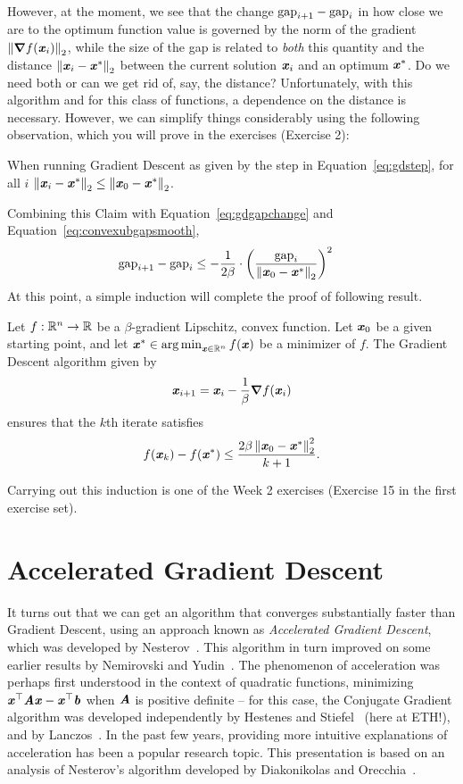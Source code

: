However, at the moment, we see that the change $\gap_{i+1}- \gap_i$
in how close we are to the optimum function value is governed by the norm of the gradient $\norm{\grad
  f(\xx_{i})}_2$, while the size of the gap is related to \emph{both}
this quantity and the distance $\norm{\xx_i - \xx^*}_2$ between the
current solution $\xx_i$ and an optimum $\xx^*$.
Do we need both or can we get rid of, say, the distance?
Unfortunately, with this algorithm and for this class of functions, a
dependence on the distance is necessary.
However, we can simplify things considerably using the following
observation, which you will prove in the exercises (Exercise 2):
\begin{claim}
  \label{clm:gdoptdist}
  When running Gradient Descent as given by the step in
  Equation~\eqref{eq:gdstep},  for all $i$
  $\norm{\xx_i - \xx^*}_2 \leq \norm{\xx_0 - \xx^*}_2$.
\end{claim}
Combining this Claim with Equation~\eqref{eq:gdgapchange} and Equation~\eqref{eq:convexubgapsmooth},
\begin{align}
\label{eq:convexgapsmooth}
  \gap_{i+1}- \gap_i
  &\leq
    -
    \frac{1}{2\beta}
    \cdot
    \left(
    \frac{\gap_i}{\norm{\xx_0 - \xx^*}_2 }
    \right)^2
\end{align}
At this point, a simple induction will complete the proof of following result.
\begin{theorem}
  \label{thm:gdsmoothconv}
  Let $f : \R^n \to \R$ be a $\beta$-gradient Lipschitz, convex
  function.
  Let $\xx_0$ be a given starting point,
  and let $\xx^* \in \argmin_{\xx \in \R^n} f(\xx)$ be a minimizer of $f$.
 The Gradient Descent algorithm given by
  \[
   \xx_{i+1} = \xx_{i} - \frac{1}{\beta} \grad f(\xx_{i})
 \]
 ensures that the $k$th iterate satisfies
 \[
   f(\xx_{k}) - f(\xx^*)\leq \frac{2\beta \norm{\xx_0 - \xx^*}_2^2}{k+1}
   .
   \]
\end{theorem}
Carrying out this induction is one of the Week 2 exercises (Exercise
15 in the first exercise set).

\section{Accelerated Gradient Descent}


It turns out that we can get an algorithm that converges substantially
faster than Gradient Descent, using an approach known as
\emph{Accelerated Gradient Descent}, which was developed by
Nesterov~\cite{n83}.
This algorithm in turn improved on some earlier results by Nemirovski and Yudin~\cite{ny83}.
The phenomenon of acceleration was perhaps first understood in the context of
quadratic functions, minimizing $\xx^\trp \AA \xx - \xx^\trp \bb$
when $\AA$ is positive definite -- for this case, the Conjugate
Gradient algorithm was developed independently by Hestenes and
Stiefel~\cite{hs52} (here at ETH!), and by Lanczos~\cite{l52}.
In the past few years, providing more intuitive explanations of
acceleration has been a popular research topic.
This presentation is based on an analysis of Nesterov's algorithm
developed by Diakonikolas and Orecchia~\cite{do19}.

